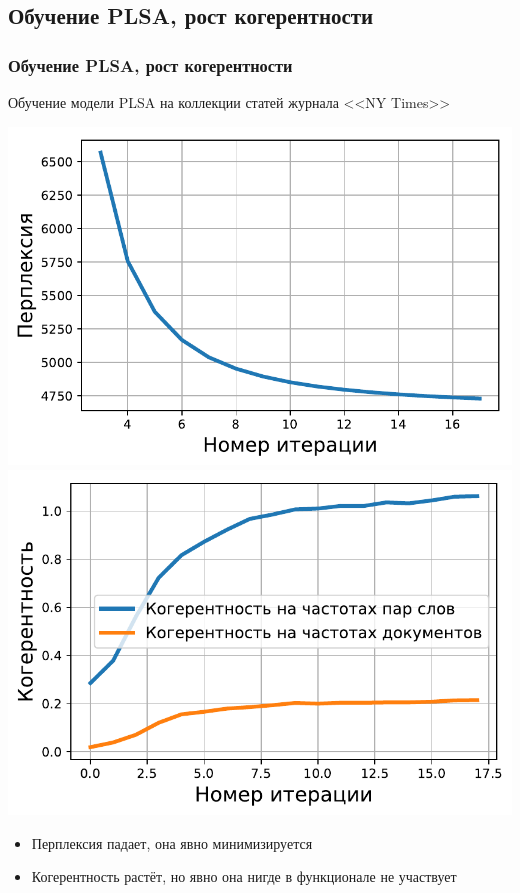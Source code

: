 \documentclass[unicode]{beamer}
\begin{document}
\subsection{Обучение PLSA, рост когерентности}
\begin{frame}
\frametitle{Обучение PLSA, рост когерентности}

Обучение модели PLSA на коллекции статей журнала <<NY Times>>

\begin{center}
    \includegraphics[scale=0.38]{perplexity_plsa_nytimes.pdf}
    \includegraphics[scale=0.38]{coherence_plsa_nytimes.pdf}
\end{center}

\begin{itemize}
    \item Перплексия падает, она явно минимизируется
    \item Когерентность растёт, но явно она нигде в функционале не участвует
\end{itemize}
\end{frame}
\end{document}
